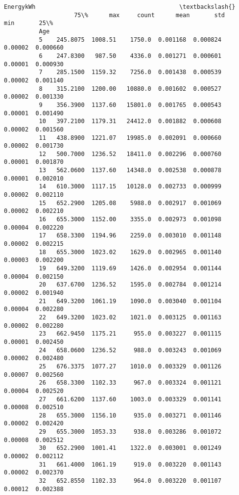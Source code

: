 \documentclass[11pt]{article}
\begin{document}
\begin{Verbatim}[commandchars=\\\{\}]
                                 EnergykWh                                         \textbackslash{}
                    75\%      max     count      mean       std      min       25\%   
          Age                                                                       
          5    245.8075  1008.51    1750.0  0.001168  0.000824  0.00002  0.000660   
          6    247.8300   987.50    4336.0  0.001271  0.000601  0.00001  0.000930   
          7    285.1500  1159.32    7256.0  0.001438  0.000539  0.00002  0.001140   
          8    315.2100  1200.00   10880.0  0.001602  0.000527  0.00002  0.001330   
          9    356.3900  1137.60   15801.0  0.001765  0.000543  0.00001  0.001490   
          10   397.2100  1179.31   24412.0  0.001882  0.000608  0.00002  0.001560   
          11   438.8900  1221.07   19985.0  0.002091  0.000660  0.00002  0.001730   
          12   500.7000  1236.52   18411.0  0.002296  0.000760  0.00001  0.001870   
          13   562.0600  1137.60   14348.0  0.002538  0.000878  0.00001  0.002010   
          14   610.3000  1117.15   10128.0  0.002733  0.000999  0.00002  0.002110   
          15   652.2900  1205.08    5988.0  0.002917  0.001069  0.00002  0.002210   
          16   655.3000  1152.00    3355.0  0.002973  0.001098  0.00004  0.002220   
          17   658.3300  1194.96    2259.0  0.003010  0.001148  0.00002  0.002215   
          18   655.3000  1023.02    1629.0  0.002965  0.001140  0.00003  0.002200   
          19   649.3200  1119.69    1426.0  0.002954  0.001144  0.00004  0.002150   
          20   637.6700  1236.52    1595.0  0.002784  0.001214  0.00002  0.001940   
          21   649.3200  1061.19    1090.0  0.003040  0.001104  0.00004  0.002280   
          22   649.3200  1023.02    1021.0  0.003125  0.001163  0.00002  0.002280   
          23   662.9450  1175.21     955.0  0.003227  0.001115  0.00001  0.002450   
          24   658.0600  1236.52     988.0  0.003243  0.001069  0.00002  0.002480   
          25   676.3375  1077.27    1010.0  0.003329  0.001126  0.00007  0.002560   
          26   658.3300  1102.33     967.0  0.003324  0.001121  0.00004  0.002520   
          27   661.6200  1137.60    1003.0  0.003329  0.001141  0.00008  0.002510   
          28   655.3000  1156.10     935.0  0.003271  0.001146  0.00002  0.002420   
          29   655.3000  1053.33     938.0  0.003286  0.001072  0.00008  0.002512   
          30   652.2900  1001.41    1322.0  0.003001  0.001249  0.00002  0.002112   
          31   661.4000  1061.19     919.0  0.003220  0.001143  0.00002  0.002370   
          32   652.8550  1102.33     964.0  0.003220  0.001107  0.00012  0.002388   

\end{Verbatim}
\end{document}
